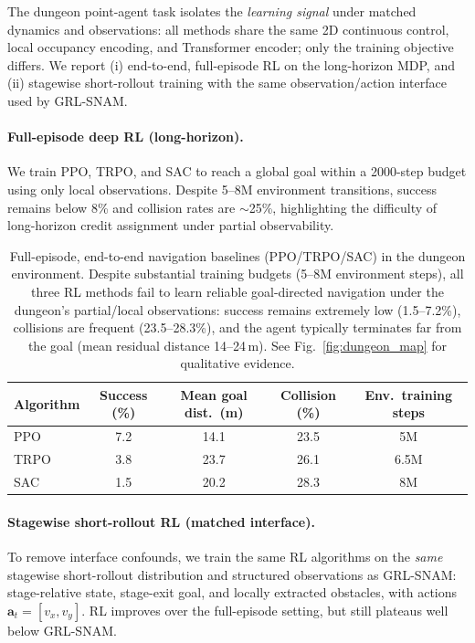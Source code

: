 The dungeon point-agent task isolates the \emph{learning signal} under matched dynamics and observations: all methods share the same 2D continuous control, local occupancy encoding, and Transformer encoder; only the training objective differs.
We report (i) end-to-end, full-episode RL on the long-horizon MDP, and (ii) stagewise short-rollout training with the same observation/action interface used by GRL-SNAM.

\paragraph{Full-episode deep RL (long-horizon).}
We train PPO, TRPO, and SAC to reach a global goal within a 2000-step budget using only local observations.
Despite 5--8M environment transitions, success remains below 8\% and collision rates are $\sim$25\%, highlighting the difficulty of long-horizon credit assignment under partial observability.

\begin{table}[htbp]
\centering
\caption[Full-episode end-to-end RL baselines in the dungeon]{
Full-episode, end-to-end navigation baselines (PPO/TRPO/SAC) in the dungeon environment.
Despite substantial training budgets (5--8M environment steps), all three RL methods
fail to learn reliable goal-directed navigation under the dungeon’s partial/local observations:
success remains extremely low (1.5--7.2\%), collisions are frequent (23.5--28.3\%), and the
agent typically terminates far from the goal (mean residual distance 14--24\,m).
See Fig.~\ref{fig:dungeon_map} for qualitative evidence.%
}
\label{tab:full_episode_rl}
\small
\begin{tabular}{lcccc}
\toprule
Algorithm & Success (\%) & Mean goal dist.\ (m) & Collision (\%) & Env.\ training steps \\
\midrule
PPO  & 7.2 & 14.1 & 23.5 & 5M \\
TRPO & 3.8 & 23.7 & 26.1 & 6.5M \\
SAC  & 1.5 & 20.2 & 28.3 & 8M \\
\bottomrule
\end{tabular}
\end{table}

\paragraph{Stagewise short-rollout RL (matched interface).}
To remove interface confounds, we train the same RL algorithms on the \emph{same} stagewise short-rollout distribution and structured observations as GRL-SNAM: stage-relative state, stage-exit goal, and locally extracted obstacles, with actions $\mathbf{a}_t=[v_x,v_y]$.
RL improves over the full-episode setting, but still plateaus well below GRL-SNAM.

